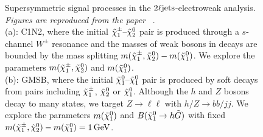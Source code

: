 \begin{figure}[t]
\caption[
Supersymmetric signal processes in the $\twoljets$-electroweak analysis
]{%
Supersymmetric signal processes in the $\twoljets$-electroweak analysis.
\emph{Figures are reproduced from the paper%
}~\cite{atlas2022searches, atlas_susy_feynman}.
\\[0.5em]
(a): C1N2, where the initial $\chargino_1\textrm{--}\neutralino_2$ pair
is produced through a $s$-channel $W^{\pm}$ resonance and the masses of
weak bosons in decays are bounded by the mass splitting
$m(\chargino_1, \neutralino_2) - m(\neutralino_1)$.
We explore the parameters
$m(\chargino_1, \neutralino_2)$ and $m(\neutralino_1)$.
\\[0.5em]
(b): GMSB, where the initial $\neutralino_1\textrm{--}\neutralino_1$ pair
is produced by soft decays from pairs including $\chargino_1$,
$\neutralino_2$ or $\neutralino_1$.
Although the $h$ and $Z$ bosons decay to many states, we target
$Z\rightarrow \ell\ell$ with
$h/Z\rightarrow bb/jj$.
We explore the parameters
$m(\neutralino_1)$ and $B(\neutralino_1 \rightarrow h \tilde{G})$ with fixed
$m(\chargino_1, \neutralino_2) - m(\neutralino_1) = 1\,\eV[G]$.
}
\label{fig:2ljets_signal_diagrams}
\end{figure}

